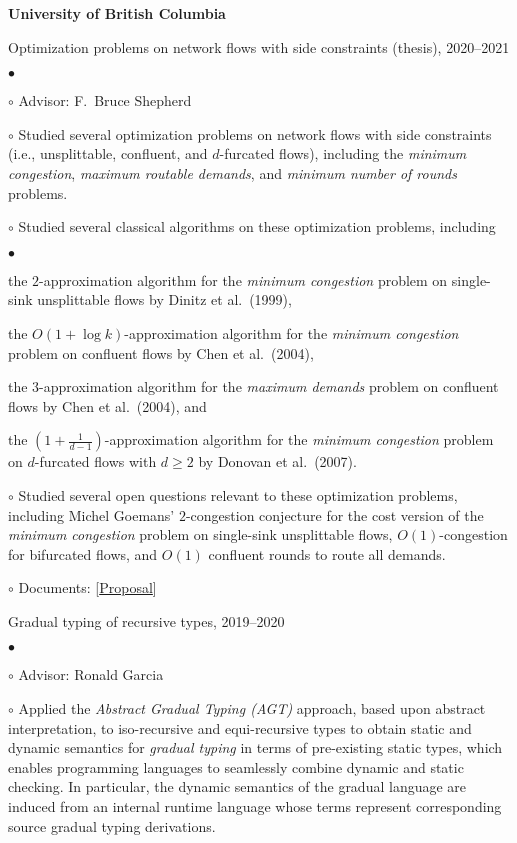\documentclass[margin,line]{res}
\newenvironment{list2}{
  \begin{list}{$\bullet$}{%
      \setlength{\itemsep}{0in}
      \setlength{\parsep}{0in} \setlength{\parskip}{0in}
      \setlength{\topsep}{0in} \setlength{\partopsep}{0in}
      \setlength{\leftmargin}{0.2in}}}{\end{list}}
\newenvironment{list3}{
  \begin{list}{\ding{113}}{%
      \setlength{\itemsep}{0.05in}
      \setlength{\parsep}{0.025in} \setlength{\parskip}{0in}
      \setlength{\topsep}{0in} \setlength{\partopsep}{0in}
      \setlength{\leftmargin}{0.17in}}}{\end{list}}
\begin{document}
\begin{resume}
{\bf University of British Columbia}\\
\vspace*{-.1in}
\begin{list3}
\item[] Optimization problems on network flows with side constraints (thesis), 2020--2021
  \begin{list2}
  \item[$\circ$] Advisor: F.\ Bruce Shepherd
  \item[$\circ$] Studied several optimization problems on network flows with side constraints (i.e., unsplittable, confluent, and $d$-furcated flows), including the \emph{minimum congestion}, \emph{maximum routable demands}, and \emph{minimum number of rounds} problems.
  \item[$\circ$] Studied several classical algorithms on these optimization problems, including
  \begin{list2}
    \item the $2$-approximation algorithm for the \emph{minimum congestion} problem on single-sink unsplittable flows by Dinitz et al.\ (1999),
    \item the $O(1 + \log k)$-approximation algorithm for the \emph{minimum congestion} problem on confluent flows by Chen et al.\ (2004),
    \item the $3$-approximation algorithm for the \emph{maximum demands} problem on confluent flows by Chen et al.\ (2004), and
    \item the $(1 + \frac{1}{d - 1})$-approximation algorithm for the \emph{minimum congestion} problem on $d$-furcated flows with $d \geq 2$ by Donovan et al.\ (2007).
  \end{list2}
  \item[$\circ$] Studied several open questions relevant to these optimization problems, including Michel Goemans' $2$-congestion conjecture for the cost version of the \emph{minimum congestion} problem on single-sink unsplittable flows, $O(1)$-congestion for bifurcated flows, and $O(1)$ confluent rounds to route all demands.
  \item[$\circ$] Documents: [\href{http://ypan.me/docs/thesis-proposal.pdf}{Proposal}]
  \end{list2}
\item[] Gradual typing of recursive types, 2019--2020
  \begin{list2}
  \item[$\circ$] Advisor: Ronald Garcia
  \item[$\circ$] Applied the \emph{Abstract Gradual Typing (AGT)} approach, based upon abstract interpretation, to iso-recursive and equi-recursive types to obtain static and dynamic semantics for \emph{gradual typing} in terms of pre-existing static types, which enables programming languages to seamlessly combine dynamic and static checking. In particular, the dynamic semantics of the gradual language are induced from an internal runtime language whose terms represent corresponding source gradual typing derivations.

\end{list2}
\end{list3}
\end{resume}
\end{document}
